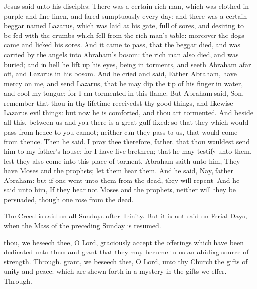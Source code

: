 \vspace{-0.5ex}
 Jesus said unto his disciples: There was a certain rich man, which was clothed in purple and fine linen, and fared sumptuously every day: and there was a certain beggar named Lazarus, which was laid at his gate, full of sores, and desiring to be fed with the crumbs which fell from the rich man's table: moreover the dogs came and licked his sores. And it came to pass, that the beggar died, and was carried by the angels into Abraham's bosom: the rich man also died, and was buried; and in hell he lift up his eyes, being in torments, and seeth Abraham afar off, and Lazarus in his bosom. And he cried and said, Father Abraham, have mercy on me, and send Lazarus, that he may dip the tip of his finger in water, and cool my tongue; for I am tormented in this flame. But Abraham said, Son, remember that thou in thy lifetime receivedst thy good things, and likewise Lazarus evil things: but now he is comforted, and thou art tormented. And beside all this, between us and you there is a great gulf fixed: so that they which would pass from hence to you cannot; neither can they pass to us, that would come from thence. Then he said, I pray thee therefore, father, that thou wouldest send him to my father's house: for I have five brethren; that he may testify unto them, lest they also come into this place of torment. Abraham saith unto him, They have Moses and the prophets; let them hear them. And he said, Nay, father Abraham: but if one went unto them from the dead, they will repent. And he said unto him, If they hear not Moses and the prophets, neither will they be persuaded, though one rose from the dead.
\begin{rubric}
    The Creed is said on all Sundays after Trinity. But it is not said on Ferial Days, when the Mass of the preceding Sunday is resumed.
\end{rubric}
\secret
{} thou, we beseech thee, O Lord, graciously accept the offerings which have been dedicated unto thee: and grant that they may become to us an abiding source of strength. Through.
 grant, we beseech thee, O Lord, unto thy Church the gifts of unity and peace: which are shewn forth in a mystery in the gifts we offer. Through.

